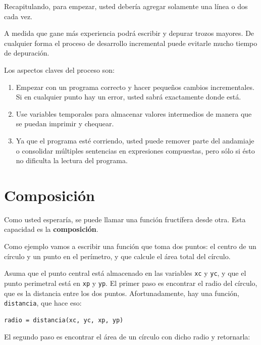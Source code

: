 Recapitulando, para empezar, usted debería agregar solamente una línea o dos cada vez.

A medida que gane más experiencia  podrá escribir y depurar trozos
mayores. De cualquier forma el proceso de desarrollo incremental
puede evitarle mucho tiempo de depuración.

Los aspectos claves del proceso son:

\begin{enumerate}

\item Empezar con un programa correcto y hacer pequeños cambios incrementales.
Si en cualquier punto hay un error, usted sabrá exactamente donde está.

\item Use variables temporales para almacenar valores intermedios de manera
que se puedan imprimir y chequear.

\item Ya que el programa esté corriendo, usted puede remover parte del 
andamiaje o consolidar múltiples sentencias en expresiones compuestas, 
pero sólo si ésto no dificulta la lectura del programa.

\end{enumerate}



\section{Composición}

Como usted esperaría, se puede llamar una función fructífera
desde otra. Esta capacidad es la {\bf composición}.

Como ejemplo vamos a escribir una función que toma dos puntos:
el centro de  un círculo y un punto en el perímetro, y que 
calcule el área total del círculo.

Asuma que el punto central está almacenado en las variables \texttt{xc} y
\texttt{yc}, y que el punto perimetral está en \texttt{xp} y \texttt{yp}. El
primer paso es encontrar el radio del círculo, que es la distancia
entre los dos puntos. Afortunadamente, hay una función, {\tt
distancia}, que hace eso:

\beforeverb
\begin{verbatim}
radio = distancia(xc, yc, xp, yp)
\end{verbatim}
\afterverb
%
El segundo paso es encontrar el área de un círculo con dicho radio y 
retornarla:

